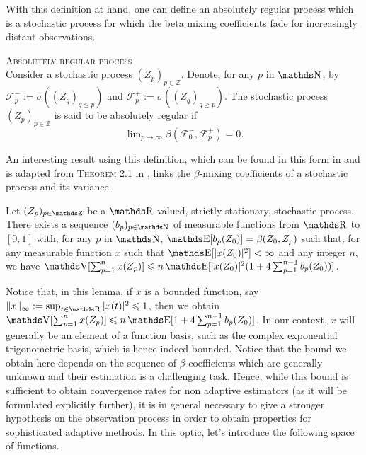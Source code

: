 With this definition at hand, one can define an absolutely regular process which is a stochastic process for which the beta mixing coefficients fade for increasingly distant observations.

\begin{de}{\textsc{Absolutely regular process} \\}\label{DE_ABSOLUTELYREGULAR_INTRO_DATA_REGULAR}
Consider a stochastic process $(Z_{p})_{p \in \mathds{Z}}$.
Denote, for any $p$ in $\N$, by $\mathcal{F}^{-}_{p} := \sigma\left((Z_{q})_{q \leq p}\right)$ and $\mathcal{F}^{+}_{p} := \sigma\left((Z_{q})_{q \geq p}\right)$.
The stochastic process $(Z_{p})_{p \in \mathds{Z}}$ is said to be absolutely regular if
\[\lim\nolimits_{p \rightarrow \infty} \beta(\mathcal{F}_{0}^{-}, \mathcal{F}_{p}^{+}) = 0.\]
\assEnd
\end{de}

An interesting result using this definition, which can be found in this form in  and is adapted from \textsc{Theorem 2.1} in , links the $\beta$-mixing coefficients of a stochastic process and its variance.

\begin{lm}\label{LMI_INTRO_DATA_REGULAR}
Let $(Z_{p})_{p \in \Z}$ be a $\R$-valued, strictly stationary, stochastic process.
There exists a sequence $(b_{p})_{p \in \N}$ of measurable functions from $\R$ to $[0, 1]$ with, for any $p$ in $\N$, $\E[b_{p}(Z_{0})] = \beta(Z_{0}, Z_{p})$ such that, for any measurable function $x$ such that $\E[\vert x(Z_{0}) \vert^{2}] < \infty$ and any integer $n$, we have $\V[\sum_{p = 1}^{n} x(Z_{p})] \leq n \E[\vert x(Z_{0}) \vert^{2} (1 + 4 \sum_{p = 1}^{n - 1} b_{p}(Z_{0}))]$.
\reEnd
\end{lm}

Notice that, in this lemma, if $x$ is a bounded function, say $\Vert x \Vert_{\infty} := \sup_{t \in \R} \vert x(t) \vert^{2} \leq 1$, then we obtain $\V[\sum_{p = 1}^{n} x(Z_{p})] \leq n \E[1 + 4 \sum_{p = 1}^{n - 1} b_{p}(Z_{0})]$.
In our context, $x$ will generally be an element of a function basis, such as the complex exponential trigonometric basis, which is hence indeed bounded.
Notice that the bound we obtain here depends on the sequence of $\beta$-coefficients which are generally unknown and their estimation is a challenging task.
Hence, while this bound is sufficient to obtain convergence rates for non adaptive estimators (as it will be formulated explicitly further), it is in general necessary to give a stronger hypothesis on the observation process in order to obtain properties for sophisticated adaptive methods.
In this optic, let's introduce the following space of functions.


